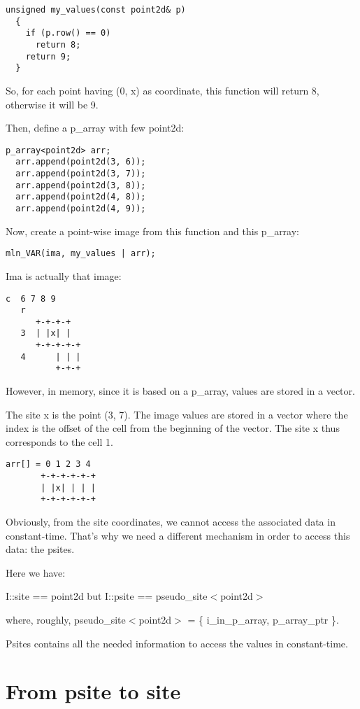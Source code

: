 \documentclass{report}
\begin{document}
\begin{lstlisting}[frame=single]
  unsigned my_values(const point2d& p)
  {
    if (p.row() == 0)
      return 8;
    return 9;
  }
\end{lstlisting}
So, for each point having (0, x) as coordinate, this function will return 8,
otherwise it will be 9.

Then, define a p\_array with few point2d:

\begin{lstlisting}[frame=single]
  p_array<point2d> arr;
  arr.append(point2d(3, 6));
  arr.append(point2d(3, 7));
  arr.append(point2d(3, 8));
  arr.append(point2d(4, 8));
  arr.append(point2d(4, 9));
\end{lstlisting}

Now, create a point-wise image from this function and this p\_array:
\begin{lstlisting}[frame=single]
  mln_VAR(ima, my_values | arr);
\end{lstlisting}

Ima is actually that image:
\begin{lstlisting}[frame=single]
    c  6 7 8 9
   r
      +-+-+-+
   3  | |x| |
      +-+-+-+-+
   4      | | |
          +-+-+
\end{lstlisting}

However, in memory, since it is based on a p\_array, values are stored in a
vector.

The site x is the point (3, 7).  The image values are stored in a
vector where the index is the offset of the cell from the beginning of the
vector. The site x thus corresponds to the cell 1.


\begin{lstlisting}[frame=single]
arr[] = 0 1 2 3 4
       +-+-+-+-+-+
       | |x| | | |
       +-+-+-+-+-+
\end{lstlisting}

Obviously, from the site coordinates, we cannot access the associated data in
constant-time. That's why we need a different mechanism in order to access
this data: the psites.

Here we have:

  I::site == point2d  but  I::psite == pseudo\_site$<$point2d$>$

where, roughly, pseudo\_site$<$point2d$>$ = \{ i\_in\_p\_array, p\_array\_ptr
\}.

Psites contains all the needed information to access the values in
constant-time.

\section{From psite to site}
\end{document}
